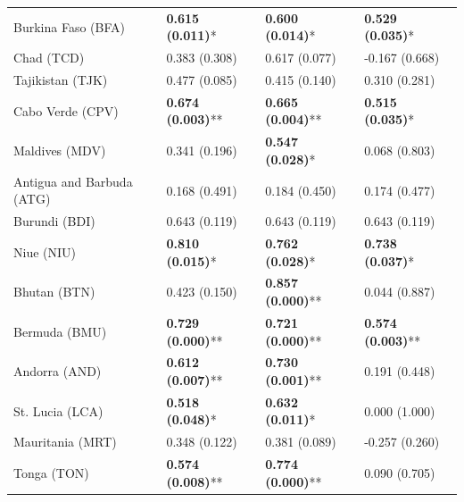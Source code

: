 \begin{longtable}{p{5cm}p{3cm}p{3cm}p{5cm}}
Burkina Faso (BFA) & \textcolor{atlLime600}{\textbf{0.615 (0.011)}*} & \textcolor{atlLime600}{\textbf{0.600 (0.014)}*} & \textcolor{atlLime600}{\textbf{0.529 (0.035)}*} \\
Chad (TCD) & \textcolor{atlOrange600}{0.383 (0.308)} & \textcolor{atlOrange600}{0.617 (0.077)} & \textcolor{atlOrange600}{-0.167 (0.668)} \\
Tajikistan (TJK) & \textcolor{atlOrange600}{0.477 (0.085)} & \textcolor{atlOrange600}{0.415 (0.140)} & \textcolor{atlOrange600}{0.310 (0.281)} \\
Cabo Verde (CPV) & \textcolor{atlLime600}{\textbf{0.674 (0.003)}**} & \textcolor{atlLime600}{\textbf{0.665 (0.004)}**} & \textcolor{atlLime600}{\textbf{0.515 (0.035)}*} \\
Maldives (MDV) & \textcolor{atlOrange600}{0.341 (0.196)} & \textcolor{atlLime600}{\textbf{0.547 (0.028)}*} & \textcolor{atlOrange600}{0.068 (0.803)} \\
Antigua and Barbuda (ATG) & \textcolor{atlOrange600}{0.168 (0.491)} & \textcolor{atlOrange600}{0.184 (0.450)} & \textcolor{atlOrange600}{0.174 (0.477)} \\
Burundi (BDI) & \textcolor{atlOrange600}{0.643 (0.119)} & \textcolor{atlOrange600}{0.643 (0.119)} & \textcolor{atlOrange600}{0.643 (0.119)} \\
Niue (NIU) & \textcolor{atlLime600}{\textbf{0.810 (0.015)}*} & \textcolor{atlLime600}{\textbf{0.762 (0.028)}*} & \textcolor{atlLime600}{\textbf{0.738 (0.037)}*} \\
Bhutan (BTN) & \textcolor{atlOrange600}{0.423 (0.150)} & \textcolor{atlLime600}{\textbf{0.857 (0.000)}**} & \textcolor{atlOrange600}{0.044 (0.887)} \\
Bermuda (BMU) & \textcolor{atlLime600}{\textbf{0.729 (0.000)}**} & \textcolor{atlLime600}{\textbf{0.721 (0.000)}**} & \textcolor{atlLime600}{\textbf{0.574 (0.003)}**} \\
Andorra (AND) & \textcolor{atlLime600}{\textbf{0.612 (0.007)}**} & \textcolor{atlLime600}{\textbf{0.730 (0.001)}**} & \textcolor{atlOrange600}{0.191 (0.448)} \\
St. Lucia (LCA) & \textcolor{atlLime600}{\textbf{0.518 (0.048)}*} & \textcolor{atlLime600}{\textbf{0.632 (0.011)}*} & \textcolor{atlOrange600}{0.000 (1.000)} \\
Mauritania (MRT) & \textcolor{atlOrange600}{0.348 (0.122)} & \textcolor{atlOrange600}{0.381 (0.089)} & \textcolor{atlOrange600}{-0.257 (0.260)} \\
Tonga (TON) & \textcolor{atlLime600}{\textbf{0.574 (0.008)}**} & \textcolor{atlLime600}{\textbf{0.774 (0.000)}**} & \textcolor{atlOrange600}{0.090 (0.705)} \\

\end{longtable}
